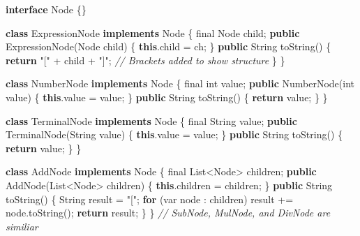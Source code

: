 \documentclass[
]{book}
\newenvironment{Shaded}{\begin{snugshade}}{\end{snugshade}}
\newcommand{\BuiltInTok}[1]{#1}
\newcommand{\CommentTok}[1]{\textcolor[rgb]{0.56,0.35,0.01}{\textit{#1}}}
\newcommand{\DataTypeTok}[1]{\textcolor[rgb]{0.13,0.29,0.53}{#1}}
\newcommand{\FunctionTok}[1]{\textcolor[rgb]{0.00,0.00,0.00}{#1}}
\newcommand{\KeywordTok}[1]{\textcolor[rgb]{0.13,0.29,0.53}{\textbf{#1}}}
\newcommand{\NormalTok}[1]{#1}
\newcommand{\StringTok}[1]{\textcolor[rgb]{0.31,0.60,0.02}{#1}}
\begin{document}
\begin{Shaded}
\begin{Highlighting}[]
\KeywordTok{interface} \BuiltInTok{Node}\NormalTok{ \{\}}

\KeywordTok{class}\NormalTok{ ExpressionNode }\KeywordTok{implements} \BuiltInTok{Node}\NormalTok{ \{}
  \DataTypeTok{final} \BuiltInTok{Node}\NormalTok{ child;}
  \KeywordTok{public} \FunctionTok{ExpressionNode}\NormalTok{(}\BuiltInTok{Node}\NormalTok{ child) \{}
    \KeywordTok{this}\NormalTok{.}\FunctionTok{child}\NormalTok{ = ch;}
\NormalTok{  \}}
  \KeywordTok{public} \BuiltInTok{String} \FunctionTok{toString}\NormalTok{() \{}
    \KeywordTok{return} \StringTok{"["}\NormalTok{ + child + }\StringTok{"]"}\NormalTok{; }\CommentTok{// Brackets added to show structure}
\NormalTok{  \}}
\NormalTok{\}}

\KeywordTok{class}\NormalTok{ NumberNode }\KeywordTok{implements} \BuiltInTok{Node}\NormalTok{ \{}
  \DataTypeTok{final} \DataTypeTok{int}\NormalTok{ value;}
  \KeywordTok{public} \FunctionTok{NumberNode}\NormalTok{(}\DataTypeTok{int}\NormalTok{ value) \{}
    \KeywordTok{this}\NormalTok{.}\FunctionTok{value}\NormalTok{ = value;}
\NormalTok{  \}}
  \KeywordTok{public} \BuiltInTok{String} \FunctionTok{toString}\NormalTok{() \{}
    \KeywordTok{return}\NormalTok{ value; }
\NormalTok{  \}}
\NormalTok{\}}

\KeywordTok{class}\NormalTok{ TerminalNode }\KeywordTok{implements} \BuiltInTok{Node}\NormalTok{ \{}
  \DataTypeTok{final} \BuiltInTok{String}\NormalTok{ value;}
  \KeywordTok{public} \FunctionTok{TerminalNode}\NormalTok{(}\BuiltInTok{String}\NormalTok{ value) \{}
    \KeywordTok{this}\NormalTok{.}\FunctionTok{value}\NormalTok{ = value;}
\NormalTok{  \}}
  \KeywordTok{public} \BuiltInTok{String} \FunctionTok{toString}\NormalTok{() \{}
    \KeywordTok{return}\NormalTok{ value; }
\NormalTok{  \}}
\NormalTok{\}}

\KeywordTok{class}\NormalTok{ AddNode }\KeywordTok{implements} \BuiltInTok{Node}\NormalTok{ \{}
  \DataTypeTok{final} \BuiltInTok{List}\NormalTok{\textless{}}\BuiltInTok{Node}\NormalTok{\textgreater{} children;}
  \KeywordTok{public} \FunctionTok{AddNode}\NormalTok{(}\BuiltInTok{List}\NormalTok{\textless{}}\BuiltInTok{Node}\NormalTok{\textgreater{} children) \{}
    \KeywordTok{this}\NormalTok{.}\FunctionTok{children}\NormalTok{ = children;}
\NormalTok{  \}}
  \KeywordTok{public} \BuiltInTok{String} \FunctionTok{toString}\NormalTok{() \{}
    \BuiltInTok{String}\NormalTok{ result = }\StringTok{"["}\NormalTok{;}
    \KeywordTok{for}\NormalTok{ (var node : children) }
\NormalTok{      result += node.}\FunctionTok{toString}\NormalTok{();}
    \KeywordTok{return}\NormalTok{ result;}
\NormalTok{  \}}
\NormalTok{\}}
\CommentTok{// SubNode, MulNode, and DivNode are similiar}
\end{Highlighting}
\end{Shaded}
\end{document}
